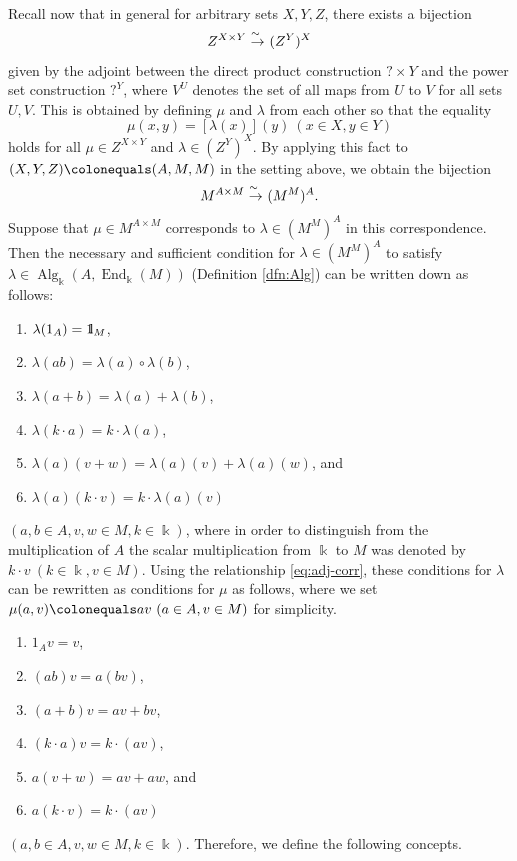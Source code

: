 \documentclass{surv-l}
\numberwithin{equation}{chapter}
\numberwithin{figure}{chapter}
\theoremstyle{plain}
\theoremstyle{definition}
\theoremstyle{remark}
\newcommand{\id}{1\kern-.25em{\text{{\rm l}}}}
\newcommand{\isoto}{\
  \raise.8ex\hbox{$^{\sim}$}\kern-.7em\hbox{$\to$}\ }
\DeclareMathOperator{\End}{End}
\DeclareMathOperator{\Alg}{Alg}
\begin{document}
Recall now that in general for arbitrary sets $X, Y, Z$,
there exists a bijection
\[
Z^{X \times Y} \isoto (Z^Y)^X
\]
given by the adjoint between the direct product construction
$? \times Y$ and the power set construction $?^Y$,
where $V^U$ denotes the set of all maps from $U$ to $V$ for all sets $U, V$.
This is obtained by defining $\mu$ and $\lambda$ from each other so
that the equality %
\begin{equation}
\label{eq:adj-corr}
\mu(x, y) = [\lambda(x)](y)\ (x \in X, y \in Y)
\end{equation}
holds for all %
$\mu \in Z^{X \times Y}$ and $\lambda \in (Z^Y)^X$.
By applying this fact to $(X, Y, Z)\colonequals  (A, M, M)$ in the setting above,
we obtain the bijection
\begin{equation}\label{eq:prod-power-adj}
M^{A \times M} \isoto (M^M)^A.
\end{equation}
Suppose that
$\mu \in M^{A \times M}$ corresponds to $\lambda \in (M^M)^A$
in this correspondence.
Then the necessary and sufficient condition for $\lambda \!\in\! (M^M)^A$ to
satisfy {\small$\lambda \!\in\! \Alg_\Bbbk(A, \End_\Bbbk(M))$} (Definition \ref{dfn:Alg}) can be written down as follows:
\begin{enumerate}[label=(R\arabic*)]
\item 
$\lambda(1_A ) = \id_M$,
\item 
$\lambda(ab) = \lambda(a)\circ \lambda(b)$,
\item
$\lambda(a + b) = \lambda(a) + \lambda(b)$,
\item
$\lambda(k\cdot a) = k\cdot \lambda(a)$,
\item
$\lambda(a)(v + w) = \lambda(a)(v) + \lambda(a)(w)$, and
\item
$\lambda(a)(k\cdot v) = k\cdot \lambda(a)(v)$
\end{enumerate}
$(a, b \in A, v, w \in M, k \in \Bbbk)$,
where in order to distinguish from the multiplication of $A$
the scalar multiplication from $\Bbbk$ to $M$ was denoted by
$k \cdot v\ (k \in \Bbbk, v \in M)$.
Using the relationship \eqref{eq:adj-corr}, these conditions for $\lambda$
can be rewritten as conditions for $\mu$ as follows, where
we set $\mu(a, v)\colonequals  av\ (a \in A, v \in M)$ for simplicity.
\begin{enumerate}[label=(M\arabic*)]
\item
$1_A v = v$,
\item
$(ab)v = a(bv)$,
\item
$(a + b)v = av + bv $,
\item
$(k\cdot a)v = k\cdot (av)$,
\item
$a(v + w) = av + aw$, and
\item
$a(k\cdot v) = k\cdot (av)$
\end{enumerate}
$(a, b \in A, v, w \in M, k \in \Bbbk)$.
Therefore, we define the following concepts.
\end{document}

